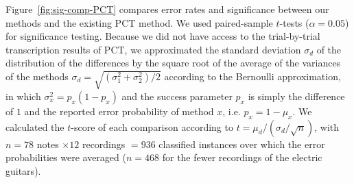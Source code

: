 \documentclass[convention,peer-reviewed]{aesconf}
\begin{document}
Figure~\ref{fig:sig-comp-PCT} compares error rates and significance between our methods and the existing PCT method. We used paired-sample $t$-tests ($\alpha = 0.05$) for significance testing. Because we did not have access to the trial-by-trial transcription results of PCT, we approximated the standard deviation $\sigma_d$ of the distribution of the differences by the square root of the average of the variances of the methods $\sigma_d = \sqrt{(\sigma^2_1+\sigma^2_2)/2}$ according to the Bernoulli approximation, in which $\sigma_x^2 = p_x(1-p_x)$ and the success parameter $p_x$ is simply the difference of $1$ and the reported error probability of method $x$, i.e. $p_x = 1-\mu_x$. We calculated the $t$-score of each comparison according to $t = \mu_d/(\sigma_d/\sqrt{n})$, with $n= 78$ notes $\times 12$ recordings $=936$ classified instances over which the error probabilities were averaged ($n=468$ for the fewer recordings of the electric guitars). 
\end{document}
